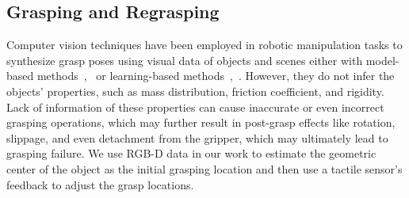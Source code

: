 \subsection{Grasping and Regrasping}
Computer vision techniques have been employed in robotic manipulation tasks to synthesize grasp poses using visual data of objects and scenes either with model-based methods~\cite{primitive},~\cite{singlepose} or learning-based methods~\cite{predict_grasp},~\cite{novelobjectgrasp}. However, they do not infer the objects' properties, such as mass distribution, friction coefficient, and rigidity. Lack of information of these properties can cause inaccurate or even incorrect grasping operations, which may further result in post-grasp effects like rotation, slippage, and even detachment from the gripper, which may ultimately lead to grasping failure. We use RGB-D data in our work to estimate the geometric center of the object as the initial grasping location and then use a tactile sensor's feedback to adjust the grasp locations.

